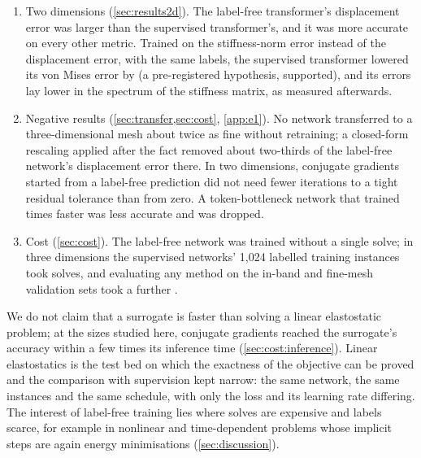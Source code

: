 \begin{enumerate}
criterion. Every supervised network returned some predictions worse than the zero field; the
label-free network returned none, averaged over each instance's load cases, and
\numThreeFreeLoadWorse{} in \numThreeFreeLoads{} load cases taken singly.
\item Two dimensions (\cref{sec:results2d}). The label-free transformer's displacement error
was \numCmFreeDispExcessAbs{} larger than the supervised transformer's, and it was more
accurate on every other metric. Trained on the stiffness-norm error instead of the
displacement error, with the same labels, the supervised transformer lowered its von Mises
error by \numHTwoBRel{} (a pre-registered hypothesis, supported), and its errors lay lower
in the spectrum of the stiffness matrix, as measured afterwards.
\item Negative results (\cref{sec:transfer,sec:cost}, \ref{app:e1}). No network transferred
to a three-dimensional mesh about twice as fine without retraining; a closed-form rescaling
applied after the fact removed about two-thirds of the label-free network's displacement
error there. In two dimensions, conjugate gradients started from a label-free prediction did
not need fewer iterations to a tight residual tolerance than from zero. A token-bottleneck
network that trained \numTimeBottleneckSpeedup{} times faster was less accurate and was
dropped.
\item Cost (\cref{sec:cost}). The label-free network was trained without a single solve;
in three dimensions the supervised networks' 1,024 labelled training instances took
\numThreeTrainSolves{} solves, and evaluating any method on the in-band and fine-mesh
validation sets took a further \numThreeEvalSolves{}.
\end{enumerate}

We do not claim that a surrogate is faster than solving a linear elastostatic problem; at
the sizes studied here, conjugate gradients reached the surrogate's accuracy within a few
times its inference time (\cref{sec:cost:inference}). Linear elastostatics
is the test bed on which the exactness of the objective can be proved and the comparison
with supervision kept narrow: the same network, the same instances and the same schedule,
with only the loss and its learning rate differing. The interest of label-free training lies
where solves are expensive and labels scarce, for example in nonlinear and time-dependent
problems whose implicit steps are again energy minimisations (\cref{sec:discussion}).

